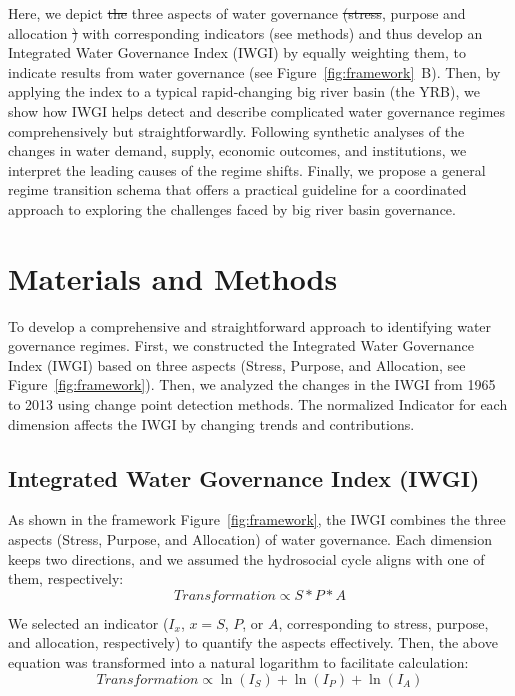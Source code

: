 \documentclass[draft]{../agujournal2019}
\providecommand{\DIFadd}[1]{{\protect\color{blue}\uwave{#1}}} %
\providecommand{\DIFdel}[1]{{\protect\color{red}\sout{#1}}}                      %
\providecommand{\DIFaddbegin}{} %
\providecommand{\DIFaddend}{} %
\providecommand{\DIFdelbegin}{} %
\providecommand{\DIFdelend}{} %
\begin{document}
Here, we depict \DIFdelbegin \DIFdel{the }\DIFdelend three aspects of water governance \DIFdelbegin \DIFdel{(stress}\DIFdelend \DIFaddbegin \DIFadd{-stress}\DIFaddend , purpose and allocation \DIFdelbegin \DIFdel{) }\DIFdelend with corresponding indicators (see methods) and thus develop an Integrated Water Governance Index (IWGI) by equally weighting them, to indicate results from water governance (see Figure~\ref{fig:framework}~B).
Then, by applying the index to a typical rapid-changing big river basin (the YRB), we show how IWGI helps detect and describe complicated water governance regimes comprehensively but straightforwardly.
Following synthetic analyses of the changes in water demand, supply, economic outcomes, and institutions, we interpret the leading causes of the regime shifts.
Finally, we propose a general regime transition schema that offers a practical guideline for a coordinated approach to exploring the challenges faced by big river basin governance.

\section{Materials and Methods}\label{sec11}


To develop a comprehensive and straightforward approach to identifying water governance regimes. First, we constructed the Integrated Water Governance Index (IWGI) based on three aspects (Stress, Purpose, and Allocation, see Figure~\ref{fig:framework}). Then, we analyzed the changes in the IWGI from 1965 to 2013 using change point detection methods. The normalized Indicator for each dimension affects the IWGI by changing trends and contributions.

\subsection{Integrated Water Governance Index (IWGI)}

As shown in the framework Figure~\ref{fig:framework}, the IWGI combines the three aspects (Stress, Purpose, and Allocation) of water governance. Each dimension keeps two directions, and we assumed the hydrosocial cycle aligns with one of them, respectively:
	\begin{equation}
		Transformation \propto S*P*A
	\end{equation}

	We selected an indicator ($I_x$, $x=S$, $P$, or $A$, corresponding to stress, purpose, and allocation, respectively) to quantify the aspects effectively. Then, the above equation was transformed into a natural logarithm to facilitate calculation:
	\begin{equation}
		Transformation \propto \ln(I_S) + \ln(I_P) + \ln(I_A)
	\end{equation}
\end{document}
